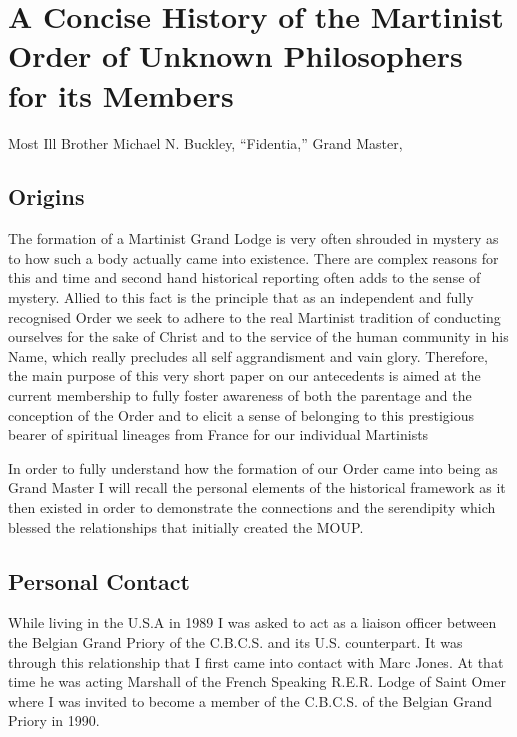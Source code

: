 \section[A Concise History of MOUP for its Members]{A Concise History of the Martinist Order of Unknown Philosophers for its Members}

Most Ill\hexdot{} Brother Michael N. Buckley, ``Fidentia,'' Grand Master, \sigi{}

\subsection{Origins}

The formation of a Martinist Grand Lodge is very often shrouded in mystery as to how such a
body actually came into existence. There are complex reasons for this and time and second hand
historical reporting often adds to the sense of mystery. Allied to this fact is the principle that as an
independent and fully recognised Order we seek to adhere to the real Martinist tradition of
conducting ourselves for the sake of Christ and to the service of the human community in his
Name, which really precludes all self aggrandisment and vain glory. Therefore, the main purpose
of this very short paper on our antecedents is aimed at the current membership to fully foster
awareness of both the parentage and the conception of the Order and to elicit a sense of belonging
to this prestigious bearer of spiritual lineages from France for our individual Martinists

In order to fully understand how the formation of our Order came into being as Grand Master I
will recall the personal elements of the historical framework as it then existed in order to
demonstrate the connections and the serendipity which blessed the relationships that initially
created the MOUP.

\subsection{Personal Contact}

While living in the U.S.A in 1989 I was asked to act as a liaison officer between the Belgian
Grand Priory of the C.B.C.S. and its U.S. counterpart. It was through this relationship that I first
came into contact with Marc Jones. At that time he was acting Marshall of the French Speaking
R.E.R. Lodge of Saint Omer where I was invited to become a member of the C.B.C.S. of the
Belgian Grand Priory in 1990.

